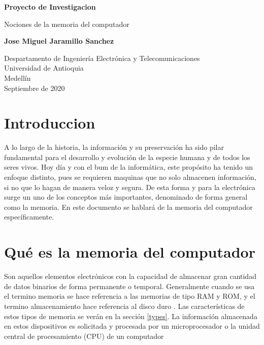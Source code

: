 \documentclass{article}
\begin{document}
\begin{titlepage}
    \begin{center}
        \vspace*{1cm}
            
        \Huge
        \textbf{Proyecto de Investigacion}
            
        \vspace{0.5cm}
        \LARGE
        Nociones de la memoria del computador
            
        \vspace{1.5cm}
            
        \textbf{Jose Miguel Jaramillo Sanchez}
            
        \vfill
            
        \vspace{0.8cm}
            
        \Large
        Despartamento de Ingeniería Electrónica y Telecomunicaciones\\
        Universidad de Antioquia\\
        Medellín\\
        Septiembre de 2020
            
    \end{center}
\end{titlepage}

\tableofcontents
\newpage
\setlength{\parskip}{2mm}
\section{Introduccion}
A lo largo de la historia, la información y su preservación ha sido pilar fundamental para el desarrollo y evolución de la especie humana y de todos los seres vivos. Hoy día y con el bum de la informática, este propósito ha tenido un enfoque distinto, pues se requieren maquinas que no solo almacenen información, si no que lo hagan de manera veloz y segura. De esta forma y para la electrónica surge un uno de los conceptos más importantes, denominado de forma general como la memoria. En este documento se hablará de la memoria del computador específicamente.

\section{Qué es la memoria del computador}
Son aquellos elementos electrónicos con la capacidad de almacenar gran cantidad de datos binarios de forma permanente o temporal. Generalmente cuando se usa el termino memoria se hace referencia a las memorias de tipo RAM y ROM, y el termino almacenamiento hace referencia al disco duro \cite{thomas}. Las características de estos tipos de memoria se verán en la sección \ref{types}. La información almacenada en estos dispositivos es solicitada y procesada por un microprocesador o la unidad central de procesamiento (CPU) de un computador
\end{document}

